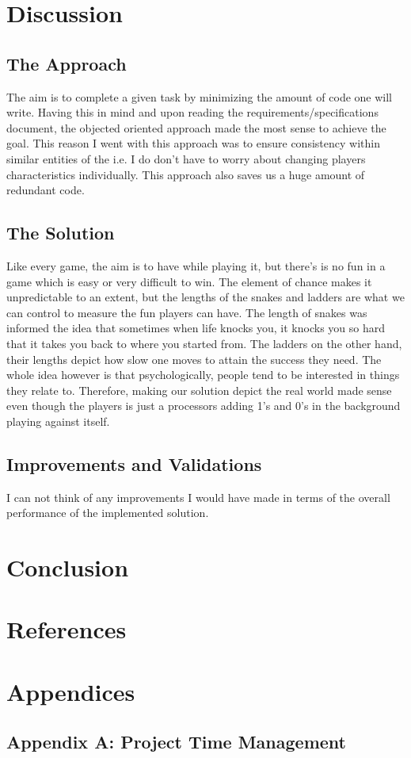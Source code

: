 \section*{Discussion}
\subsection*{The Approach}
The aim is to complete a given task by minimizing the amount of code one will write. Having this in mind and upon reading the requirements/specifications document, the objected oriented approach made the most sense to achieve the goal. This reason I went with this approach was to ensure consistency within similar entities of the i.e. I do don't have to worry about changing players characteristics individually. This approach also saves us a huge amount of redundant code.
\subsection*{The Solution}
Like every game, the aim is to have while playing it, but there's is no fun in a game which is easy or very difficult to win. The element of chance makes it unpredictable to an extent, but the lengths of the snakes and ladders are what we can control to measure the fun players can have. The length of snakes was informed the idea that sometimes when life knocks you, it knocks you so hard that it takes you back to where you started from. The ladders on the other hand, their lengths depict how slow one moves to attain the success they need. The whole idea however is that psychologically, people tend to be interested in things they relate to. Therefore, making our solution depict the real world made sense even though the players is just a processors adding 1's and 0's in the background playing against itself.
\subsection{Improvements and Validations}
I can not think of any improvements I would have made in terms of the overall performance of the implemented solution. 

\section*{Conclusion}

\newpage
\section*{References}


\newpage
\section*{Appendices}
\subsection*{Appendix A: Project Time Management}


 

